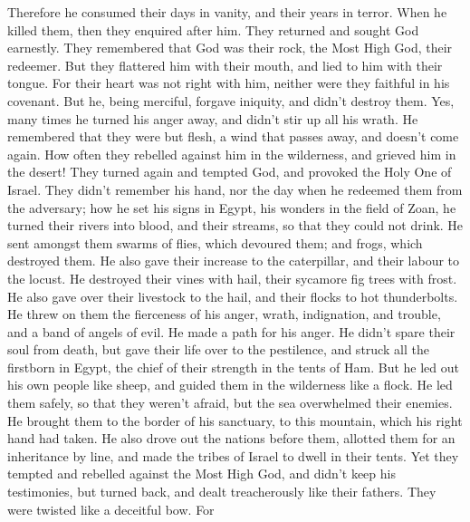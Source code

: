 Therefore he consumed their days in vanity, and their years in terror.
 When he killed them, then they enquired after him. They
returned and sought God earnestly.  They remembered that
God was their rock, the Most High God, their redeemer.  But
they flattered him with their mouth, and lied to him with their tongue.
 For their heart was not right with him, neither were they
faithful in his covenant.  But he, being merciful, forgave
iniquity, and didn't destroy them. Yes, many times he turned his anger
away, and didn't stir up all his wrath.  He remembered that
they were but flesh, a wind that passes away, and doesn't come again.
 How often they rebelled against him in the wilderness, and
grieved him in the desert!  They turned again and tempted
God, and provoked the Holy One of Israel.  They didn't
remember his hand, nor the day when he redeemed them from the adversary;
 how he set his signs in Egypt, his wonders in the field of
Zoan,  he turned their rivers into blood, and their
streams, so that they could not drink.  He sent amongst
them swarms of flies, which devoured them; and frogs, which destroyed
them.  He also gave their increase to the caterpillar, and
their labour to the locust.  He destroyed their vines with
hail, their sycamore fig trees with frost.  He also gave
over their livestock to the hail, and their flocks to hot thunderbolts.
 He threw on them the fierceness of his anger, wrath,
indignation, and trouble, and a band of angels of evil.  He
made a path for his anger. He didn't spare their soul from death, but
gave their life over to the pestilence,  and struck all the
firstborn in Egypt, the chief of their strength in the tents of Ham.
 But he led out his own people like sheep, and guided them
in the wilderness like a flock.  He led them safely, so
that they weren't afraid, but the sea overwhelmed their enemies.
 He brought them to the border of his sanctuary, to this
mountain, which his right hand had taken.  He also drove
out the nations before them, allotted them for an inheritance by line,
and made the tribes of Israel to dwell in their tents.  Yet
they tempted and rebelled against the Most High God, and didn't keep his
testimonies,  but turned back, and dealt treacherously like
their fathers. They were twisted like a deceitful bow.  For
